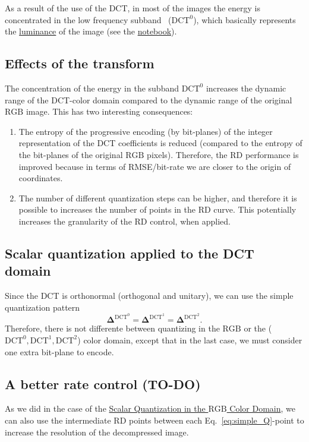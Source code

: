 As a result of the use of the DCT, in most of the images the energy is
concentrated in the low frequency
subband~\cite{vruiz__transform_coding} ($\text{DCT}^0$), which
basically represents the
\href{https://en.wikipedia.org/wiki/Luminance}{luminance} of the
image (see the \href{https://github.com/Sistemas-Multimedia/Sistemas-Multimedia.github.io/blob/master/contents/RGB_DCT_SQ/RGB_DCT_SQ.ipynb}{notebook}).

\subsection{Effects of the transform}
The concentration of the energy in the subband $\text{DCT}^0$
increases the dynamic range of the DCT-color domain compared to the
dynamic range of the original $\text{RGB}$ image. This has two
interesting consequences:
\begin{enumerate}
\item The entropy of the progressive encoding (by bit-planes) of the
  integer representation of the DCT coefficients is reduced (compared
  to the entropy of the bit-planes of the original $\text{RGB}$
  pixels). Therefore, the RD performance is improved because in terms
  of RMSE/bit-rate we are closer to the origin of coordinates.
\item The number of different quantization steps can be higher, and
  therefore it is possible to increases the number of points in the RD
  curve. This potentially increases the granularity of the RD control,
  when applied.
\end{enumerate}

\subsection{Scalar quantization applied to the DCT domain}
Since the DCT is orthonormal (orthogonal and unitary), we can use the
simple quantization pattern
\begin{equation}
  \mathbf{\Delta}^{\text{DCT}^0} = \mathbf{\Delta}^{\text{DCT}^1} = \mathbf{\Delta}^{\text{DCT}^2}.
  \label{eq:simple_Q}
\end{equation}
Therefore, there is not differente between quantizing in the
$\text{RGB}$ or the ($\text{DCT}^0,\text{DCT}^1,\text{DCT}^2$) color
domain, except that in the last case, we must consider one extra
bit-plane to encode.

\subsection{A better rate control (TO-DO)}
\label{sec:increasing}
As we did in the case of the
\href{https://sistemas-multimedia.github.io/contents/RGB_SQ/}{Scalar
  Quantization in the $\text{RGB}$ Color Domain}, we can also use the
intermediate RD points between each Eq.~\eqref{eq:simple_Q}-point to
increase the resolution of the decompressed image.

